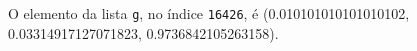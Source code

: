 \documentclass[12pt,varwidth=16cm,border=1pt]{standalone}
\begin{document}
O elemento da lista \verb+g+, no índice \verb+16426+, é (0.010101010101010102, 0.03314917127071823, 0.9736842105263158).

\questiomtrue
\end{document}
